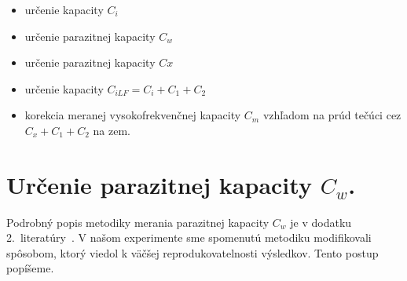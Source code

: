 \begin{itemize}
\item určenie kapacity $C_i$
\item určenie parazitnej kapacity $C_w$
\item určenie parazitnej kapacity $Cx$
\item určenie kapacity $C_{iLF}  = C_i  + C_1  + C_2$
\item korekcia meranej vysokofrekvenčnej kapacity $C_m$ vzhľadom na
  prúd tečúci cez $C_x + C_1 + C_2$ na zem.
\end{itemize}


\section{Určenie parazitnej kapacity $C_w$.}\label{sec:E.1}

Podrobný popis metodiky merania parazitnej kapacity $C_w$ je v dodatku
2.\ literatúry~\cite{App.2}. V našom experimente sme spomenutú
metodiku modifikovali spôsobom, ktorý viedol k väčšej
reprodukovatelnosti výsledkov. Tento postup popíšeme.

